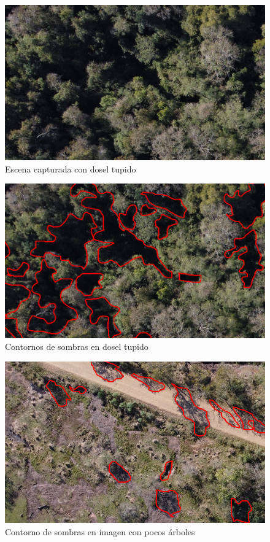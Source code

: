 \begin{figure}
    \includegraphics[width=\textwidth]{Imagenes/dense canopy.jpg}
     \hfill
     \caption{Escena capturada con dosel tupido}
    \label{tupido}
\end{figure}


\begin{figure}
    \includegraphics[width=\textwidth]{Imagenes/contours.png}
     \hfill
     \caption{Contornos de sombras en dosel tupido}
    \label{contorno1}
\end{figure}

\begin{figure}
    \includegraphics[width=\textwidth]{Imagenes/contours2.png}
     \hfill
     \caption{Contorno de sombras en imagen con pocos árboles}
    \label{contorno2}
\end{figure}

